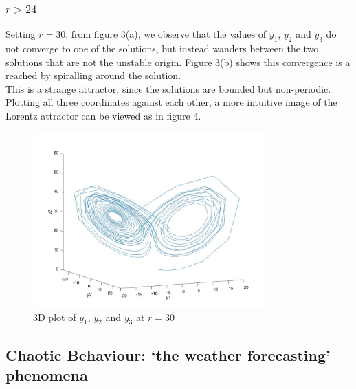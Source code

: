 \documentclass[a4paper,11pt]{article}
\begin{document}
\subsubsection{$r>24$}

Setting $r=30$, from figure 3(a), we observe that the values of $y_{1}$, $y_{2}$ and $y_{3}$ do not converge to one of the solutions, but instead wanders between the two solutions that are not the unstable origin. Figure 3(b) shows this convergence is a reached by spiralling around the solution.
\\

This is a strange attractor, since the solutions are bounded but non-periodic. Plotting all three coordinates against each other, a more intuitive image of the Lorentz attractor can be viewed as in figure 4.









\begin{figure}

     \centering
         \includegraphics[width=0.8\textwidth]{r30_3D}
         \caption{3D plot of $y_{1}$, $y_{2}$ and $y_{3}$ at $r=30$}

\end{figure}



\subsection{Chaotic Behaviour: `the weather forecasting' phenomena}
\end{document}
